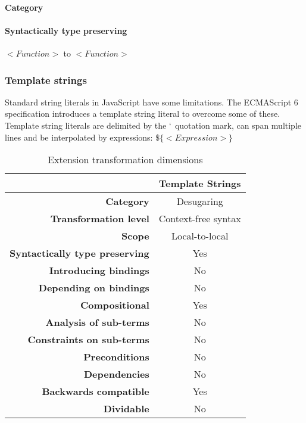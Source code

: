 \documentclass[10pt,a4paper]{article}
\begin{document}
\paragraph{Category}


\paragraph{Syntactically type preserving}
$<Function>$ to $<Function>$

\subsubsection{Template strings}
Standard string literals in JavaScript have some limitations. The ECMAScript 6 specification introduces a template string literal to overcome some of these\cite[12.2.8]{SpecJS}. Template string literals are delimited by the $`$ quotation mark, can span multiple lines and be interpolated by expressions: $\$\{<Expression>\}$

\begin{table}[H]
\centering
\caption{Extension transformation dimensions}
\label{template-strings-table}
\begin{tabular}{@{}rc@{}}
\toprule
                                       & \multicolumn{1}{l}{\textbf{Template Strings}} \\ \midrule
\textbf{Category}                      & Desugaring
\\
\textbf{Transformation level}          & Context-free syntax                          \\
\textbf{Scope}                         & Local-to-local                               \\
\textbf{Syntactically type preserving} & Yes                                          \\
\textbf{Introducing bindings}          & No                                          \\%
\textbf{Depending on bindings}         & No                                           \\
\textbf{Compositional}                 & Yes                                          \\
\textbf{Analysis of sub-terms}          & No                                          \\
\textbf{Constraints on sub-terms}       & No                                           \\
\textbf{Preconditions}                 & No                                          \\
\textbf{Dependencies}                  & No                                           \\
\textbf{Backwards compatible}          & Yes                                          \\
\textbf{Dividable}                     & No                                           \\ \bottomrule
\end{tabular}
\end{table}
\end{document}
